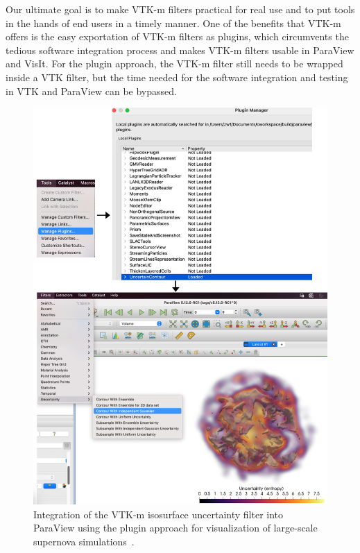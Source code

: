 Our ultimate goal is to make VTK-m filters practical for real use and to put tools in the hands of end users in a timely manner. One of the benefits that VTK-m offers is the easy exportation of VTK-m filters as plugins, which circumvents the tedious software integration process and makes VTK-m filters usable in ParaView and VisIt. For the plugin approach, the VTK-m filter still needs to be wrapped inside a VTK filter, but the time needed for the software integration and testing in VTK and ParaView can be bypassed.       

\begin{figure}[htb]
  \includegraphics[width=\linewidth]{figures/isosurfaceUncertaintyPlugin.png}
  \caption{Integration of the VTK-m isosurface uncertainty filter into ParaView using the plugin approach for visualization of large-scale supernova simulations~\cite{Sandoval2021}.}
  \label{fig:uncertainty-plugin}
\end{figure}

